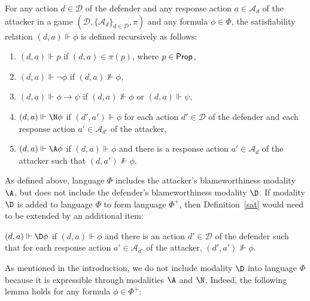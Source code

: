 \documentclass[letterpaper]{article}
\begin{document}
\begin{definition}\label{sat}
For any action $d\in\mathcal{D}$ of the defender and any response action $a\in\mathcal{A}_d$ of the attacker in a game $(\mathcal{D},\{\mathcal{A}_d\}_{d\in\mathcal{D}},\pi)$ and any formula $\phi\in\Phi$, the satisfiability relation $(d,a)\Vdash\phi$ is defined recursively as follows:
\begin{enumerate}
    \item $(d,a)\Vdash p$ if $(d,a)\in \pi(p)$, where $p\in {\sf Prop}$,
    \item $(d,a)\Vdash \neg\phi$ if $(d,a)\nVdash \phi$,
    \item $(d,a)\Vdash\phi\to\psi$ if $(d,a)\nVdash\phi$ or $(d,a)\Vdash\psi$,
    \item $(d,a)\Vdash\N\phi$ if $(d',a')\Vdash\phi$ for each action $d'\in\mathcal{D}$ of the defender and each response action $a'\in\mathcal{A}_{d'}$ of the attacker,
    \item $(d,a)\Vdash\A\phi$ if $(d,a)\Vdash\phi$ and there is a response action $a'\in\mathcal{A}_d$ of the attacker such that  $(d,a')\nVdash\phi$.
\end{enumerate}
\end{definition}

As defined above, language $\Phi$ includes the attacker's blameworthiness modality $\A$, but does not include the defender's blameworthiness modality $\D$. If modality $\D$ is added to language $\Phi$ to form language $\Phi^+$, then Definition~\ref{sat} would need to be extended by an additional item:
\begin{enumerate}
{\em
  \setcounter{enumi}{5}
  \item $(d,a)\Vdash\D\phi$ if $(d,a)\Vdash\phi$ and there is an action $d'\in\mathcal{D}$ of the defender such that for each response action $a'\in \mathcal{A}_{d'}$ of the attacker, $(d',a')\nVdash\phi$.}
\end{enumerate}
As mentioned in the introduction, we do not include modality $\D$ into language $\Phi$ because it is expressible through modalities $\A$ and $\N$. Indeed, the following lemma holds for any formula $\phi\in\Phi^+$:
\end{document}
